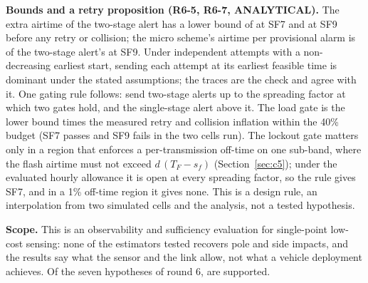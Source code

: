 \documentclass{ieeeaccess}
\begin{document}
\textbf{Bounds and a retry proposition (R6-5, R6-7, ANALYTICAL).} The extra airtime of the two-stage alert has a lower bound of \RSixBoundSevenR{} at SF7 and \RSixBoundNineR{} at SF9 before any retry or collision; the micro scheme's airtime per provisional alarm is \RSixMicroOverRNine{} of the two-stage alert's at SF9. Under independent attempts with a non-decreasing earliest start, sending each attempt at its earliest feasible time is dominant under the stated assumptions; the traces are the check and agree with it. One gating rule follows: send two-stage alerts up to the spreading factor at which two gates hold, and the single-stage alert above it. The load gate is the lower bound times the measured retry and collision inflation within the 40\% budget (SF7 passes and SF9 fails in the two cells run). The lockout gate matters only in a region that enforces a per-transmission off-time on one sub-band, where the flash airtime must not exceed $d\,(T_F - s_f)$ (Section~\ref{sec:c5}); under the evaluated hourly allowance it is open at every spreading factor, so the rule gives SF7, and in a 1\% off-time region it gives none. This is a design rule, an interpolation from two simulated cells and the analysis, not a tested hypothesis.

\textbf{Scope.} This is an observability and sufficiency evaluation for single-point low-cost sensing: none of the estimators tested recovers pole and side impacts, and the results say what the sensor and the link allow, not what a vehicle deployment achieves. Of the seven hypotheses of round 6, \RSixSupp{} are supported.
\end{document}
